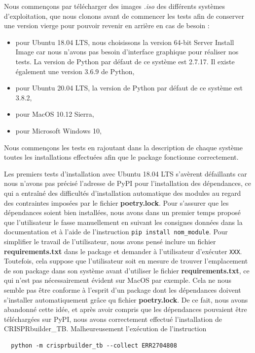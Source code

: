 \documentclass[twoside,a4paper,11pt,frenchb,openany]{report}
\begin{document}
Nous commençons par télécharger des images \textit{.iso} des différents systèmes d'exploitation, que nous clonons avant de commencer les tests afin de conserver une version vierge pour pouvoir revenir en arrière en cas de besoin :
\begin{itemize}
\item pour Ubuntu 18.04 LTS, nous choisissons la version 64-bit Server Install Image car nous n'avons pas besoin d'interface graphique pour réaliser nos tests. La version de Python par défaut de ce système est 2.7.17. Il existe également une version 3.6.9 de Python,
\item pour Ubuntu 20.04 LTS, la version de Python par défaut de ce système est 3.8.2,
\item pour MacOS 10.12 Sierra, 
\item pour Microsoft Windows 10, 
\end{itemize}

Nous commençons les tests en rajoutant dans la description de chaque système toutes les installations effectuées afin que le package fonctionne correctement.

Les premiers tests d'installation avec Ubuntu 18.04 LTS s'avèrent défaillants car nous n'avons pas précisé l'adresse de PyPI pour l'installation des dépendances, ce qui a entraîné des difficultés d'installation automatique des modules au regard des contraintes imposées par le fichier \textbf{poetry.lock}. Pour s'assurer que les dépendances soient bien installées, nous avons dans un premier temps proposé que l'utilisateur le fasse manuellement en suivant les consignes données dans la documentation et à l'aide de l'instruction \texttt{pip install nom\_module}. Pour simplifier le travail de l'utilisateur, nous avons pensé inclure un fichier \textbf{requirements.txt} dans le package et demander à l'utilisateur d'exécuter \texttt{XXX}. Toutefois, cela suppose que l'utilisateur soit en mesure de trouver l'emplacement de son package dans son système avant d'utiliser le fichier \textbf{requirements.txt}, ce qui n'est pas nécessairement évident sur MacOS par exemple. Cela ne nous semble pas être conforme à l'esprit d'un package dont les dépendances doivent s'installer automatiquement grâce qu fichier \textbf{poetry.lock}. De ce fait, nous avons abandonné cette idée, et après avoir compris que les dépendances pouvaient être téléchargées sur PyPI, nous avons correctement effectué l'installation de CRISPRbuilder\_TB. Malheureusement l'exécution de l'instruction

\begin{verbatim}
  python -m crisprbuilder_tb --collect ERR2704808
\end{verbatim}
\end{document}
